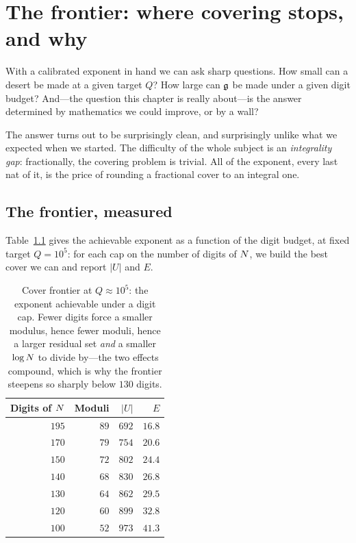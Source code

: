 \chapter{The frontier: where covering stops, and why}\label{ch:frontier}

With a calibrated exponent in hand we can ask sharp questions. How small can a
desert be made at a given target $Q$? How large can $\mathfrak{g}$ be made under a given
digit budget? And---the question this chapter is really about---is the answer
determined by mathematics we could improve, or by a wall?

The answer turns out to be surprisingly clean, and surprisingly unlike what we
expected when we started. The difficulty of the whole subject is an
\emph{integrality gap}: fractionally, the covering problem is trivial. All of
the exponent, every last nat of it, is the price of rounding a fractional cover
to an integral one.

\section{The frontier, measured}

Table~\ref{tab:frontier} gives the achievable exponent as a function of the
digit budget, at fixed target $Q=10^{5}$: for each cap on the number of digits
of $N$, we build the best cover we can and report $|U|$ and $E$.

\begin{table}[h]
\centering\small
\caption{Cover frontier at $Q\approx10^{5}$: the exponent achievable under a
digit cap. Fewer digits force a smaller modulus, hence fewer moduli, hence a
larger residual set \emph{and} a smaller $\log N$ to divide by---the two effects
compound, which is why the frontier steepens so sharply below $130$
digits.}\label{tab:frontier}
\begin{tabular}{rrrr}
\toprule
Digits of $N$ & Moduli & $|U|$ & $E$\\
\midrule
$195$ & $89$ & $692$ & $16.8$\\
$170$ & $79$ & $754$ & $20.6$\\
$150$ & $72$ & $802$ & $24.4$\\
$140$ & $68$ & $830$ & $26.8$\\
$130$ & $64$ & $862$ & $29.5$\\
$120$ & $60$ & $899$ & $32.8$\\
$100$ & $52$ & $973$ & $41.3$\\
\bottomrule
\end{tabular}
\end{table}

